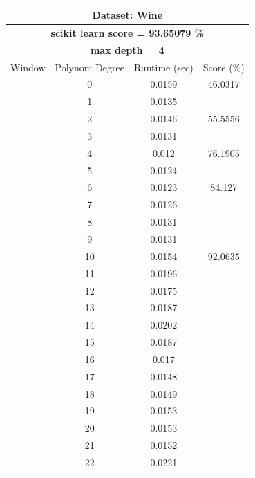 \documentclass{article}
\begin{document}
\begin{multicols}{2}
\begin{table}[H]
\caption{}
\label{tab:my-table}
\begin{tabular}{|c|c|c|c|}
\hline
\multicolumn{4}{|c|}{\textbf{Dataset: Wine}} \\ \hline
\multicolumn{4}{|c|}{\textbf{scikit learn score = 93.65079 \%}} \\ \hline
\multicolumn{4}{|c|}{\textbf{max depth = 4}} \\ \hline
Window & Polynom Degree & Runtime (sec) & Score (\%) \\ \hline
 & 0 & 0.0159 & 46.0317 \\ \cline{2-4} 
 & 1 & 0.0135 &  \\ \cline{2-3}
 & 2 & 0.0146 & \multirow{-2}{*}{55.5556} \\ \cline{2-4} 
 & 3 & 0.0131 &  \\ \cline{2-3}
 & 4 & 0.012 & \multirow{-2}{*}{76.1905} \\ \cline{2-4} 
 & 5 & 0.0124 &  \\ \cline{2-3}
 & 6 & 0.0123 & \multirow{-2}{*}{84.127} \\ \cline{2-4} 
 & 7 & 0.0126 &  \\ \cline{2-3}
 & 8 & 0.0131 &  \\ \cline{2-3}
 & 9 & 0.0131 &  \\ \cline{2-3}
 & 10 & 0.0154 & \multirow{-4}{*}{92.0635} \\ \cline{2-4} 
 & \cellcolor[HTML]{FFFFC7}11 & \cellcolor[HTML]{FFFFC7}0.0196 & \cellcolor[HTML]{FFFFC7} \\ \cline{2-3}
 & 12 & 0.0175 & \cellcolor[HTML]{FFFFC7} \\ \cline{2-3}
 & 13 & 0.0187 & \cellcolor[HTML]{FFFFC7} \\ \cline{2-3}
 & 14 & 0.0202 & \cellcolor[HTML]{FFFFC7} \\ \cline{2-3}
 & 15 & 0.0187 & \cellcolor[HTML]{FFFFC7} \\ \cline{2-3}
 & 16 & 0.017 & \cellcolor[HTML]{FFFFC7} \\ \cline{2-3}
 & 17 & 0.0148 & \cellcolor[HTML]{FFFFC7} \\ \cline{2-3}
 & 18 & 0.0149 & \cellcolor[HTML]{FFFFC7} \\ \cline{2-3}
 & 19 & 0.0153 & \cellcolor[HTML]{FFFFC7} \\ \cline{2-3}
 & 20 & 0.0153 & \cellcolor[HTML]{FFFFC7} \\ \cline{2-3}
 & 21 & 0.0152 & \cellcolor[HTML]{FFFFC7} \\ \cline{2-3}
 & 22 & 0.0221 & \cellcolor[HTML]{FFFFC7} \\ \cline{2-3}

\end{tabular}
\end{table}
\end{multicols}
\end{document}
